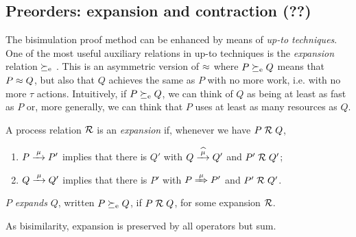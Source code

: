 \subsection{Preorders: expansion and contraction (??)}

The bisimulation proof method can be enhanced by means of \emph{up-to
  techniques}. One of the most useful auxiliary relations in up-to
techniques  is the \emph{expansion} relation  $\mathrel{\succeq_{\rm{e}}}$ \cite{SaMi92}. This is an asymmetric version
of $\approx$ where $P \mathrel{\succeq_{\rm{e}}} Q$  means that 
 $P \approx Q$,
but also that $Q$  achieves  the same as  $P$ 
with  no more work, i.e. with no more $\tau$ actions.
Intuitively, if $ P \mathrel{\succeq_{\rm{e}}} Q$, we can think of $Q$ as being 
at least as fast as $P$
or, more generally, we can think that $P$  uses at least as many resources as $Q$.

\begin{definition}[expansion]
\label{d:expa}
A process relation ${{\cal R}}$ 
 is an {\em  expansion} if, whenever
we have $P\mathrel{\cal R} Q$, %
\begin{enumerate}
\item   $P \arr\mu P'$ implies that there is $Q'$ with $Q \arcap \mu
  Q'$
 and $P' \mathrel{\cal R} Q'$;
\item 
    $Q \arr\mu Q'$   implies that there is $P'$ with $P \Arr \mu
 P'$ and $P' 
\mathrel{\cal R} Q'$.
\end{enumerate}
 $P$  {\em expands} $Q$, written
$P  \mathrel{\succeq_{\rm{e}}} Q$, 
if $P \mathrel{\cal R} Q$,  for some expansion ${\cal R}$. 
\end{definition}

As bisimilarity, expansion is preserved by all operators but sum.
